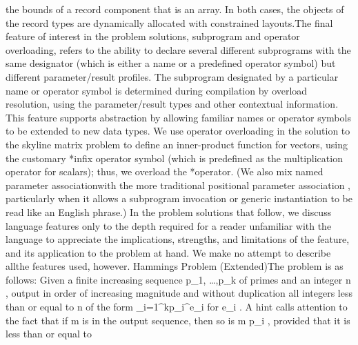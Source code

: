 the bounds of a record component that is an array. In both cases,
the objects of the record types are dynamically allocated with constrained
layouts.\Endpara[]
\Para[]The final feature of interest in the problem solutions, %
\txtxemph[]subprogram and operator overloading\txtxendemph[], refers
to the ability to declare several different subprograms with the same
designator (which is either a name or a predefined operator symbol)
but different parameter/result profiles. The subprogram designated
by a particular name or operator symbol is determined during compilation
by overload resolution, using the parameter/result types and other
contextual information. This feature supports abstraction by allowing
familiar names or operator symbols to be extended to new data types.
We use operator overloading in the solution to the skyline matrix
problem to define an inner-product function for vectors, using the
customary \tyxffmxmono[]*\tyxffmxendmono[] infix operator symbol (which
is predefined as the multiplication operator for scalars); thus, we
overload the \tyxffmxmono[]*\tyxffmxendmono[] operator. (We also mix
\txtxemph[]named parameter association\txtxendemph[] with the more
traditional \txtxemph[]positional parameter association%
\txtxendemph[], particularly when it allows a subprogram invocation
or generic instantiation to be read like an English phrase.)%
\Endpara[]
\Para[]In the problem solutions that follow, we discuss language features
only to the depth required for a reader unfamiliar with the language
to appreciate the implications, strengths, and limitations of the
feature, and its application to the problem at hand. We make no attempt
to describe \txtxemph[]all\txtxendemph[] the features used, however.%
\Endpara[]
\DivEndiv[]
\DivEndiii[]
\HdMjLiii[]Hamming\rsquo[]s Problem
(Extended)\HdMjEndiii[]
\Para[]The problem is as follows: Given a finite increasing sequence
\InlEqn[]\LmthEqn[]p_{1},
\ldots ,p_{k}
\LmthEndeqn[]\EndInlEqn[] of primes and an integer \InlEqn[]\LmthEqn[]n
\LmthEndeqn[]%
\EndInlEqn[], output in order of increasing magnitude and without
duplication all integers less than or equal to \InlEqn[]\LmthEqn[]n
\LmthEndeqn[]%
\EndInlEqn[] of the form 
\DispEqn[]
\DmthEqn[]
\prod \limits _{i=1}^{k}p_{i}^{e_{i}}
\DmthEndeqn[]\EndDispEqn[]
for \InlEqn[]\LmthEqn[]e_{i}
\LmthEndeqn[]\EndInlEqn[]. A hint calls attention to the fact that
if \InlEqn[]\LmthEqn[]m
\LmthEndeqn[]\EndInlEqn[] is in the output sequence, then so is %
\InlEqn[]\LmthEqn[]m
\cdot p_{i}
\LmthEndeqn[]\EndInlEqn[], provided that it is less than or equal to %

